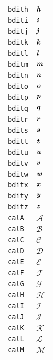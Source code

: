 \begin{longtable}{ll}
\texttt{bdith}&${}{\textbf{\textit{h}}}{}$\\
\texttt{bditi}&${}{\textbf{\textit{i}}}{}$\\
\texttt{bditj}&${}{\textbf{\textit{j}}}{}$\\
\texttt{bditk}&${}{\textbf{\textit{k}}}{}$\\
\texttt{bditl}&${}{\textbf{\textit{l}}}{}$\\
\texttt{bditm}&${}{\textbf{\textit{m}}}{}$\\
\texttt{bditn}&${}{\textbf{\textit{n}}}{}$\\
\texttt{bdito}&${}{\textbf{\textit{o}}}{}$\\
\texttt{bditp}&${}{\textbf{\textit{p}}}{}$\\
\texttt{bditq}&${}{\textbf{\textit{q}}}{}$\\
\texttt{bditr}&${}{\textbf{\textit{r}}}{}$\\
\texttt{bdits}&${}{\textbf{\textit{s}}}{}$\\
\texttt{bditt}&${}{\textbf{\textit{t}}}{}$\\
\texttt{bditu}&${}{\textbf{\textit{u}}}{}$\\
\texttt{bditv}&${}{\textbf{\textit{v}}}{}$\\
\texttt{bditw}&${}{\textbf{\textit{w}}}{}$\\
\texttt{bditx}&${}{\textbf{\textit{x}}}{}$\\
\texttt{bdity}&${}{\textbf{\textit{y}}}{}$\\
\texttt{bditz}&${}{\textbf{\textit{z}}}{}$\\
\texttt{calA}&${}{\mathcal{A}}{}$\\
\texttt{calB}&${}{\mathcal{B}}{}$\\
\texttt{calC}&${}{\mathcal{C}}{}$\\
\texttt{calD}&${}{\mathcal{D}}{}$\\
\texttt{calE}&${}{\mathcal{E}}{}$\\
\texttt{calF}&${}{\mathcal{F}}{}$\\
\texttt{calG}&${}{\mathcal{G}}{}$\\
\texttt{calH}&${}{\mathcal{H}}{}$\\
\texttt{calI}&${}{\mathcal{I}}{}$\\
\texttt{calJ}&${}{\mathcal{J}}{}$\\
\texttt{calK}&${}{\mathcal{K}}{}$\\
\texttt{calL}&${}{\mathcal{L}}{}$\\
\texttt{calM}&${}{\mathcal{M}}{}$\\

\end{longtable}

